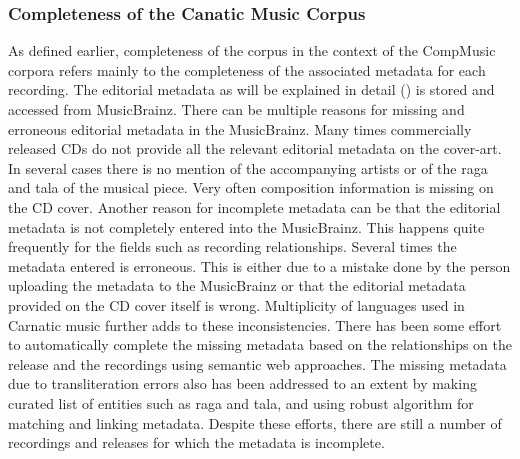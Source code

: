 \subsubsection{Completeness of the Canatic Music Corpus}
\label{sec:corpus_completeness_of_completeness_of_carnatic_music_corpus}

As defined earlier, completeness of the corpus in the context of the CompMusic corpora refers mainly to the completeness of the associated metadata
for each recording. The editorial metadata as will be explained in detail () is stored and accessed from MusicBrainz. There can be multiple reasons for missing and erroneous editorial metadata in the MusicBrainz. Many times commercially released CDs do not provide all the relevant editorial metadata on the cover-art. In several cases there is no mention of the accompanying artists or of the \gls{raga} and \gls{tala} of the musical piece. Very often composition information is missing on the CD cover. Another reason for incomplete metadata can be that the editorial metadata is not completely entered into the MusicBrainz. This happens quite frequently for the fields such as recording relationships. Several times the metadata entered is erroneous. This is either due to a mistake done by the person uploading the metadata to the MusicBrainz or that the editorial metadata provided on the CD cover itself is wrong. Multiplicity of languages used in Carnatic music further adds to these inconsistencies. There has been some effort to automatically complete the missing metadata based on the relationships on the release and the recordings using semantic web approaches. The missing metadata due to transliteration errors also has been addressed to an extent by making curated list of entities such as \gls{raga} and \gls{tala}, and using robust algorithm for matching and linking metadata. Despite these efforts, there are still a number of recordings and releases for which the metadata is incomplete.


